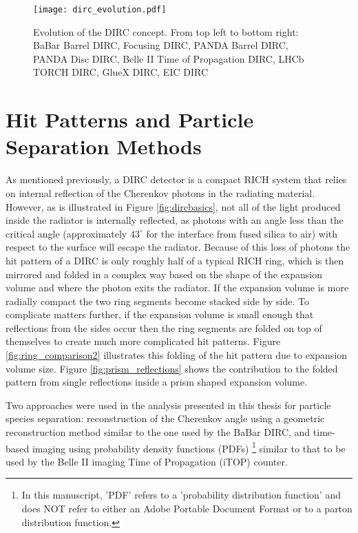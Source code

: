 \begin{figure}[H]
	\centering
	\texttt{[image: dirc\_evolution.pdf]}
	\caption{Evolution of the DIRC concept. From top left to bottom right: BaBar Barrel DIRC, Focusing DIRC, PANDA Barrel DIRC, PANDA Disc DIRC, Belle II Time of Propagation DIRC, LHCb TORCH DIRC, GlueX DIRC, EIC DIRC}
	\label{fig:dirc_evolution}
\end{figure}

\section{Hit Patterns and Particle Separation Methods}
As mentioned previously, a DIRC detector is a compact RICH system that relies on internal reflection of the Cherenkov photons in the radiating material. However, as is illustrated in Figure \ref{fig:dircbasics}, not all of the light produced inside the radiator is internally reflected, as photons with an angle less than the critical angle (approximately $43^{\circ}$ for the interface from fused silica to air) with respect to the surface will escape the radiator. Because of this loss of photons the hit pattern of a DIRC is only roughly half of a typical RICH ring, which is then mirrored and folded in a complex way based on the shape of the expansion volume and where the photon exits the radiator. If the expansion volume is more radially compact the two ring segments become stacked side by side. To complicate matters further, if the expansion volume is small enough that reflections from the sides occur then the ring segments are folded on top of themselves to create much more complicated hit patterns. Figure \ref{fig:ring_comparison2} illustrates this folding of the hit pattern due to expansion volume size. Figure \ref{fig:prism_reflections} shows the contribution to the folded pattern from single reflections inside a prism shaped expansion volume.

Two approaches were used in the analysis presented in this thesis for particle species separation: reconstruction of the Cherenkov angle using a geometric reconstruction method similar to the one used by the BaBar DIRC, and time-based imaging using probability density functions (PDFs) \footnote{In this manuscript, 'PDF' refers to a 'probability distribution function' and does NOT refer to either an Adobe\textsuperscript{\textregistered} Portable Document Format or to a parton distribution function.} similar to that to be used by the Belle II imaging Time of Propagation (iTOP) counter.

